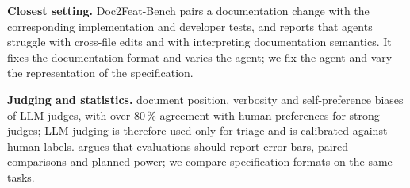 \documentclass{article}
\begin{document}
\textbf{Closest setting.} Doc2Feat-Bench \citep{jiang2025doc2feat} pairs a documentation change with the
corresponding implementation and developer tests, and reports that agents struggle with cross-file edits and
with interpreting documentation semantics. It fixes the documentation format and varies the agent; we fix the
agent and vary the representation of the specification.

\textbf{Judging and statistics.} \citet{zheng2023judge} document position, verbosity and self-preference biases of LLM
judges, with over 80\,\% agreement with human preferences for strong judges; LLM judging is therefore used only for triage and
is calibrated against human labels. \citet{miller2024errorbars} argues that evaluations should report error bars, paired
comparisons and planned power; we compare specification formats on the same tasks.
\end{document}

